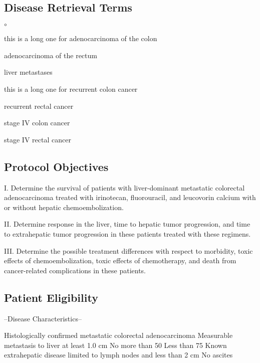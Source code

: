 \documentclass[12pt]{article}
\newcounter{qC}
\begin{document}
\subsection*{Disease Retrieval Terms}
\begin{list}{$\circ$}{\setlength{\itemsep}{-5pt}}
\item this is a long one for adenocarcinoma of the colon 
\item adenocarcinoma of the rectum 
\item liver metastases            
\item this is a long one for recurrent colon cancer 
\item recurrent rectal cancer     
\item stage IV colon cancer 
\item stage IV rectal cancer      
\end{list}

\setcounter{qC}{0}
\subsection*{Protocol Objectives}
I.  Determine the survival of patients with liver-dominant metastatic colorectal
adenocarcinoma treated with irinotecan, fluorouracil, and leucovorin calcium
with or without hepatic chemoembolization.
                                     
II.  Determine response in the liver, time to hepatic tumor progression, and
time to extrahepatic tumor progression in these patients treated with these
regimens.
                                     
III.  Determine the possible treatment differences with respect to morbidity,
toxic effects of chemoembolization, toxic effects of chemotherapy, and death
from cancer-related complications in these patients.

\setcounter{qC}{0}
\subsection*{Patient Eligibility}                
--Disease Characteristics--

Histologically confirmed metastatic colorectal adenocarcinoma
Measurable metastasis to liver at least 1.0 cm
No more than 50%
Less than 75%
Known extrahepatic disease limited to lymph nodes and less than 2 cm
No ascites
                                     
\end{document}
